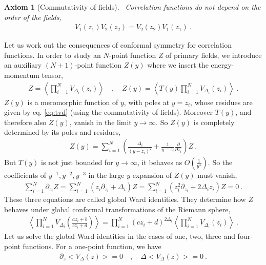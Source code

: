 \documentclass[12pt, a4paper]{article}
\theoremstyle{break}
\newtheorem{hyp}[exo]{Axiom}
\begin{document}
\begin{hyp}[Commutativity of fields]
 ~\label{hyp:ass}
 Correlation functions do not depend on the order of the fields,
 \begin{align}
  V_1(z_1) V_2(z_2) = V_2(z_2)V_1(z_1)\ .
 \end{align}
\end{hyp}

Let us work out the consequences of conformal symmetry for correlation functions.
In order to study an $N$-point function $Z$ of primary fields, we introduce an auxiliary $(N+1)$-point function $Z(y)$ where we insert the energy-momentum tensor,
\begin{align}
 Z = \left< \prod_{i=1}^N V_{\Delta_i}(z_i) \right> \quad , \quad Z(y) = \left< T(y) \prod_{i=1}^N V_{\Delta_i}(z_i) \right> \ .
\end{align}
$Z(y)$ is a meromorphic function of $y$, with poles at $y=z_i$, whose residues are given by eq. \eqref{eq:tvd} (using the commutativity of fields).
Moreover $T(y)$, and therefore also $Z(y)$, vanish in the limit $y\to \infty$. So $Z(y)$ is completely determined by its poles and residues,
\begin{align}
 Z(y) = \sum_{i=1}^N \left(\frac{\Delta_i}{(y-z_i)^2} +\frac{1}{y-z_i}\frac{\partial}{\partial z_i}\right) Z\ .
 \label{eq:zy}
\end{align}
But $T(y)$ is not just bounded for $y\to \infty$, it behaves as $O(\frac{1}{y^4})$.
So the coefficients of $y^{-1}, y^{-2}, y^{-3}$ in the large $y$ expansion of $Z(y)$ must vanish, 
\begin{align}
 \sum_{i=1}^N \partial_{z_i} Z = \sum_{i=1}^N \left(z_i \partial_{z_i} + \Delta_i\right) Z = \sum_{i=1}^N \left(z_i^2 \partial_{z_i} + 2\Delta_iz_i\right) Z = 0\ .
 \label{eq:gward}
\end{align}
These three equations are called global Ward identities. They determine how $Z$ behaves under global conformal transformations of the Riemann sphere,
\begin{align}
 \left< \prod_{i=1}^N  V_{\Delta_i}\left(\frac{az_i+b}{cz_i+d}\right) \right>
 = \prod_{i=1}^N (cz_i +d)^{2\Delta_i} \left< \prod_{i=1}^N V_{\Delta_i}(z_i) \right>\ .
 \label{eq:zgc}
\end{align}
Let us solve the global Ward identities in the cases of one, two, three and four-point functions. For a one-point function, we have 
\begin{align}
\partial_z \Big< V_\Delta(z)\Big> = 0 \quad , \quad \Delta \Big< V_\Delta(z)\Big> = 0\ .
\end{align}
\end{document}
